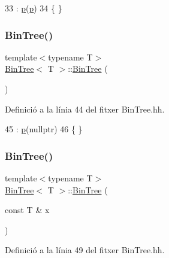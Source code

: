 \begin{DoxyCode}
33     :   \hyperlink{class_bin_tree_afe3647af1dda90f6ddf1deee6560fcf1}{p}(\hyperlink{class_bin_tree_afe3647af1dda90f6ddf1deee6560fcf1}{p})
34     \{   \}
\end{DoxyCode}
\mbox{\label{class_bin_tree_a47eef22d29cd023449d97c073c08e5b6}} 
\subsubsection{\texorpdfstring{Bin\+Tree()}{BinTree()}\hspace{0.1cm}{\footnotesize\ttfamily [2/4]}}
{\footnotesize\ttfamily template$<$typename T$>$ \\
\hyperlink{class_bin_tree}{Bin\+Tree}$<$ T $>$\+::\hyperlink{class_bin_tree}{Bin\+Tree} (\begin{DoxyParamCaption}{ }\end{DoxyParamCaption})}



Definició a la línia 44 del fitxer Bin\+Tree.\+hh.


\begin{DoxyCode}
45     :   \hyperlink{class_bin_tree_afe3647af1dda90f6ddf1deee6560fcf1}{p}(\textcolor{keyword}{nullptr})
46     \{   \}
\end{DoxyCode}
\mbox{\label{class_bin_tree_a1ab686e0bcf990093ff91fe71744c1a4}} 
\subsubsection{\texorpdfstring{Bin\+Tree()}{BinTree()}\hspace{0.1cm}{\footnotesize\ttfamily [3/4]}}
{\footnotesize\ttfamily template$<$typename T$>$ \\
\hyperlink{class_bin_tree}{Bin\+Tree}$<$ T $>$\+::\hyperlink{class_bin_tree}{Bin\+Tree} (\begin{DoxyParamCaption}\item[{const T \&}]{x }\end{DoxyParamCaption})\hspace{0.3cm}{\ttfamily [explicit]}}



Definició a la línia 49 del fitxer Bin\+Tree.\+hh.


